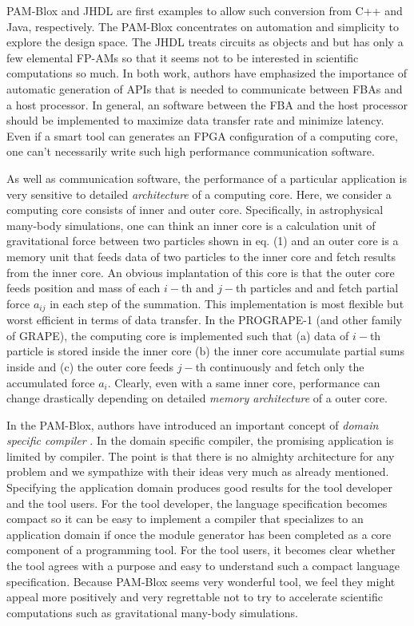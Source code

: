 \documentclass{llncs}
\begin{document}
PAM-Blox\cite{MMF97} and JHDL\cite{BH98} are first examples
to allow such conversion from C++ and Java, respectively.
The PAM-Blox concentrates on automation and simplicity to explore the design space.
The JHDL treats circuits as objects and but has only a few elemental FP-AMs
so that it seems not to be interested in scientific computations so much.  
In both work, authors have emphasized the importance of automatic
generation of APIs that is needed to communicate between FBAs and a host processor.
In general, an software between the FBA and the host processor
should be implemented to maximize data transfer rate and minimize latency.
Even if a smart tool can generates an FPGA configuration of a computing core,
one can't necessarily write such high performance communication software.

As well as communication software, 
the performance of a particular application
is very sensitive to detailed {\it architecture} of a computing core.
Here, we consider a computing core consists of inner and outer core.
Specifically, in astrophysical many-body simulations,
one can think an inner core is a calculation unit of gravitational force between two particles
shown in eq. (1) and an outer core is a memory unit that feeds data of two particles 
to the inner core and fetch results from the inner core. 
An obvious implantation of this core is that the outer core
feeds position and mass of each $i-$th and $j-$th particles and
and fetch partial force $a_{ij}$ in each step of the summation.
This implementation is most flexible but worst efficient in terms of data transfer.
In the PROGRAPE-1 (and other family of GRAPE\cite{MT98}),
the computing core is implemented such that
(a) data of $i-$th particle is stored inside the inner core
(b) the inner core accumulate partial sums inside
and (c) the outer core feeds $j-$th continuously and 
fetch only the accumulated force $a_{i}$.
Clearly, even with a same inner core, performance 
can change drastically depending on detailed {\it memory architecture} of a outer core.

In the PAM-Blox\cite{MMF97}, authors have introduced an important concept
of {\it domain specific compiler} \cite{MPMF01}. 
In the domain specific compiler, the promising application is limited by
compiler. The point is that there is no almighty architecture for any problem
and we sympathize with their ideas very much as already mentioned.
Specifying the application domain produces good results for
the tool developer and the tool users.  For the tool developer, the
language specification becomes compact so it can be easy to implement
a compiler that specializes to an application domain if once the
module generator has been completed as a core component of a
programming tool.  For the tool users, it becomes clear whether the
tool agrees with a purpose and easy to understand such a compact
language specification.
Because PAM-Blox seems very wonderful tool, we feel they might appeal
more positively and very regrettable not to try to accelerate 
scientific computations such as gravitational many-body simulations.
\end{document}
